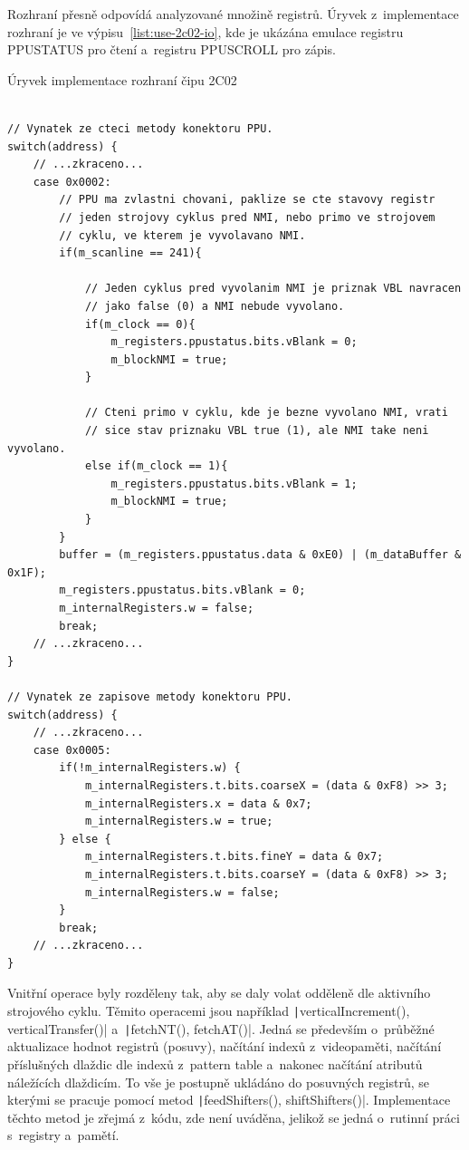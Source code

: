 Rozhraní přesně odpovídá analyzované množině registrů. Úryvek z~implementace rozhraní je ve výpisu~\ref{list:use-2c02-io}, kde je ukázána emulace registru PPUSTATUS pro čtení a~registru PPUSCROLL pro zápis.

\begin{listing}
	\caption{Úryvek implementace rozhraní čipu 2C02}
	\label{list:use-2c02-io}
	\begin{verbatim}

// Vynatek ze cteci metody konektoru PPU.
switch(address) {
	// ...zkraceno...
	case 0x0002:
		// PPU ma zvlastni chovani, paklize se cte stavovy registr
		// jeden strojovy cyklus pred NMI, nebo primo ve strojovem
		// cyklu, ve kterem je vyvolavano NMI.
	    if(m_scanline == 241){

			// Jeden cyklus pred vyvolanim NMI je priznak VBL navracen
			// jako false (0) a NMI nebude vyvolano.
			if(m_clock == 0){
				m_registers.ppustatus.bits.vBlank = 0;
				m_blockNMI = true;
			}
			
			// Cteni primo v cyklu, kde je bezne vyvolano NMI, vrati
			// sice stav priznaku VBL true (1), ale NMI take neni vyvolano.
			else if(m_clock == 1){
				m_registers.ppustatus.bits.vBlank = 1;
				m_blockNMI = true;
			}
		}
		buffer = (m_registers.ppustatus.data & 0xE0) | (m_dataBuffer & 0x1F);
		m_registers.ppustatus.bits.vBlank = 0;
		m_internalRegisters.w = false;
		break;
	// ...zkraceno...
}

// Vynatek ze zapisove metody konektoru PPU.
switch(address) {
	// ...zkraceno...
	case 0x0005:
		if(!m_internalRegisters.w) {
			m_internalRegisters.t.bits.coarseX = (data & 0xF8) >> 3;
			m_internalRegisters.x = data & 0x7;
			m_internalRegisters.w = true;
		} else {
			m_internalRegisters.t.bits.fineY = data & 0x7;
			m_internalRegisters.t.bits.coarseY = (data & 0xF8) >> 3;
			m_internalRegisters.w = false;
		}
		break;
	// ...zkraceno...
}
	\end{verbatim}
\end{listing}

Vnitřní operace byly rozděleny tak, aby se daly volat odděleně dle aktivního strojového cyklu. Těmito operacemi jsou například \texttt|verticalIncrement(), verticalTransfer()| a~\texttt|fetchNT(), fetchAT()|. Jedná se především o~průběžné aktualizace hodnot registrů (posuvy), načítání indexů z~videopaměti, načítání příslušných dlaždic dle indexů z~pattern table a~nakonec načítání atributů náležících dlaždicím. To vše je postupně ukládáno do posuvných registrů, se kterými se pracuje pomocí metod \texttt|feedShifters(), shiftShifters()|. Implementace těchto metod je zřejmá z~kódu, zde není uváděna, jelikož se jedná o~rutinní práci s~registry a~pamětí.

